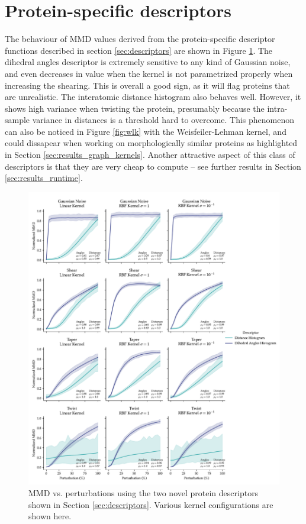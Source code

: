 \section{Protein-specific descriptors}\label{sec:results_protein_descriptors}

The behaviour of MMD values derived from the protein-specific descriptor
functions described in section \ref{sec:descriptors} are shown in Figure
\ref{fig:protein_specific_descriptors}. The dihedral angles descriptor is
extremely sensitive to any kind of Gaussian noise, and even decreases in value
when the kernel is not parametrized properly when increasing the shearing. This
is overall a good sign, as it will flag proteins that are unrealistic. The
interatomic distance histogram also behaves well. However, it shows high
variance when twisting the protein, presumably because the intra-sample variance
in distances is a threshold hard to overcome. This phenomenon can also be
noticed in Figure \ref{fig:wlk} with the Weisfeiler-Lehman kernel, and could
dissapear when working on morphologically similar proteins as highlighted in
Section \ref{sec:results_graph_kernels}. Another attractive aspect of this class
of descriptors is that they are very cheap to compute -- see further results in
Section \ref{sec:results_runtime}.

\begin{figure}
  \includegraphics[width=\textwidth]{./figures/results/res_4.pdf}
  \caption[MMD vs. perturbations using the two novel protein descriptors.]{MMD vs. perturbations using the two novel protein descriptors shown
    in Section \ref{sec:descriptors}. Various kernel configurations are shown
    here.}
  \label{fig:protein_specific_descriptors}
\end{figure}

